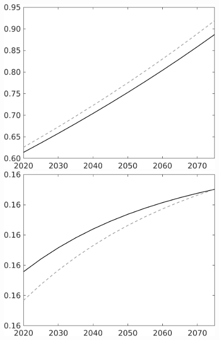 \documentclass[12pt]{article}
\begin{document}
\begin{figure}
\begin{minipage}[]{0.32\textwidth}
	\end{minipage}	
	\begin{minipage}[]{0.32\textwidth}
		\includegraphics[width=1\textwidth]{../../codding_model/own_basedOnFried/optimalPol_010922_revision/figures/all_13Sept22/LevTaufNoTauf_TaulCalib_regime0_N_spillover0_nsk0_xgr0_knspil1_sep1_LFlimit0_emsbase0_countec0_GovRev0_etaa0.79_lgd0.png}
	\end{minipage}		
	\begin{minipage}[]{0.32\textwidth}
		\includegraphics[width=1\textwidth]{../../codding_model/own_basedOnFried/optimalPol_010922_revision/figures/all_13Sept22/LevTaufNoTauf_TaulCalib_regime0_Ln_spillover0_nsk0_xgr0_knspil1_sep1_LFlimit0_emsbase0_countec0_GovRev0_etaa0.79_lgd0.png}

\end{minipage}
\end{figure}
\end{document}

